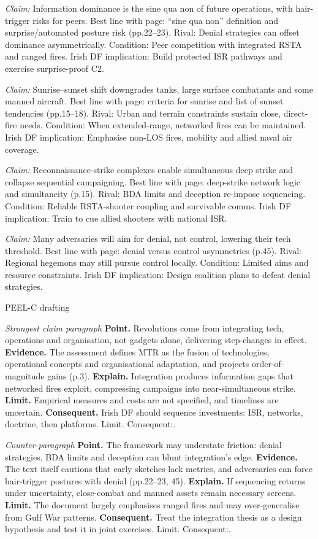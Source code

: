 \textit{Claim:} Information dominance is the sine qua non of future operations, with hair-trigger risks for peers.
Best line with page: “sine qua non” definition and surprise/automated posture risk (pp.22–23). Rival: Denial strategies can offset dominance asymmetrically. Condition: Peer competition with integrated RSTA and ranged fires. Irish DF implication: Build protected ISR pathways and exercise surprise-proof C2.

\textit{Claim:} Sunrise–sunset shift downgrades tanks, large surface combatants and some manned aircraft.
Best line with page: criteria for sunrise and list of sunset tendencies (pp.15–18). Rival: Urban and terrain constraints sustain close, direct-fire needs. Condition: When extended-range, networked fires can be maintained. Irish DF implication: Emphasise non-LOS fires, mobility and allied naval air coverage.

\textit{Claim:} Reconnaissance-strike complexes enable simultaneous deep strike and collapse sequential campaigning.
Best line with page: deep-strike network logic and simultaneity (p.15). Rival: BDA limits and deception re-impose sequencing. Condition: Reliable RSTA-shooter coupling and survivable comms. Irish DF implication: Train to cue allied shooters with national ISR.

\textit{Claim:} Many adversaries will aim for denial, not control, lowering their tech threshold.
Best line with page: denial versus control asymmetries (p.45). Rival: Regional hegemons may still pursue control locally. Condition: Limited aims and resource constraints. Irish DF implication: Design coalition plans to defeat denial strategies.

PEEL-C drafting

\textit{Strongest claim paragraph}
\textbf{Point.} Revolutions come from integrating tech, operations and organisation, not gadgets alone, delivering step-changes in effect.
\textbf{Evidence.} The assessment defines MTR as the fusion of technologies, operational concepts and organisational adaptation, and projects order-of-magnitude gains (p.3).
\textbf{Explain.} Integration produces information gaps that networked fires exploit, compressing campaigns into near-simultaneous strike.
\textbf{Limit.} Empirical measures and costs are not specified, and timelines are uncertain.
\textbf{Consequent.} Irish DF should sequence investments: ISR, networks, doctrine, then platforms. Limit. Consequent:.

\textit{Counter-paragraph}
\textbf{Point.} The framework may understate friction: denial strategies, BDA limits and deception can blunt integration’s edge.
\textbf{Evidence.} The text itself cautions that early sketches lack metrics, and adversaries can force hair-trigger postures with denial (pp.22–23, 45).
\textbf{Explain.} If sequencing returns under uncertainty, close-combat and manned assets remain necessary screens.
\textbf{Limit.} The document largely emphasises ranged fires and may over-generalise from Gulf War patterns.
\textbf{Consequent.} Treat the integration thesis as a design hypothesis and test it in joint exercises. Limit. Consequent:.

